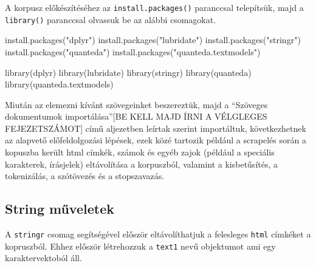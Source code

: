 \documentclass[
]{book}
\newenvironment{Shaded}{\begin{snugshade}}{\end{snugshade}}
\newcommand{\FunctionTok}[1]{\textcolor[rgb]{0.00,0.00,0.00}{#1}}
\newcommand{\NormalTok}[1]{#1}
\newcommand{\StringTok}[1]{\textcolor[rgb]{0.31,0.60,0.02}{#1}}
\begin{document}
A korpusz előkészítéséhez az \texttt{install.packages()} paranccsal
telepítsük, majd a \texttt{library()} paranccsal olvassuk be az alábbi
csomagokat.

\begin{Shaded}
\begin{Highlighting}[]

\FunctionTok{install.packages}\NormalTok{(}\StringTok{"dplyr"}\NormalTok{)}
\FunctionTok{install.packages}\NormalTok{(}\StringTok{"lubridate"}\NormalTok{)}
\FunctionTok{install.packages}\NormalTok{(}\StringTok{"stringr"}\NormalTok{)}
\FunctionTok{install.packages}\NormalTok{(}\StringTok{"quanteda"}\NormalTok{)}
\FunctionTok{install.packages}\NormalTok{(}\StringTok{"quanteda.textmodels"}\NormalTok{)}
\end{Highlighting}
\end{Shaded}

\begin{Shaded}
\begin{Highlighting}[]


\FunctionTok{library}\NormalTok{(dplyr)}
\FunctionTok{library}\NormalTok{(lubridate)}
\FunctionTok{library}\NormalTok{(stringr)}
\FunctionTok{library}\NormalTok{(quanteda)}
\FunctionTok{library}\NormalTok{(quanteda.textmodels)}
\end{Highlighting}
\end{Shaded}

Miután az elemezni kívánt szövegeinket beszereztük, majd a ``Szöveges
dokumentumok importálása''{[}BE KELL MAJD ÍRNI A VÉLGLEGES
FEJEZETSZÁMOT{]} című aljezetben leírtak szerint importáltuk,
következhetnek az alapvető előfeldolgozási lépések, ezek közé tartozik
például a scrapelés során a kopuszba került html címkék, számok és egyéb
zajok (például a speciális karakterek, írásjelek) eltávolítása a
korpuszból, valamint a kisbetűsítés, a tokenizálás, a szótövezés és a
stopszavazás.

\hypertarget{string-mux171veletek}{%
\subsection{String műveletek}\label{string-mux171veletek}}

A \texttt{stringr} csomag segítségével először eltávolíthatjuk a
felesleges \texttt{html} címkéket a kopruszból. Ehhez először
létrehozzuk a \texttt{text1} nevű objektumot ami egy karaktervektoból
áll.
\end{document}
